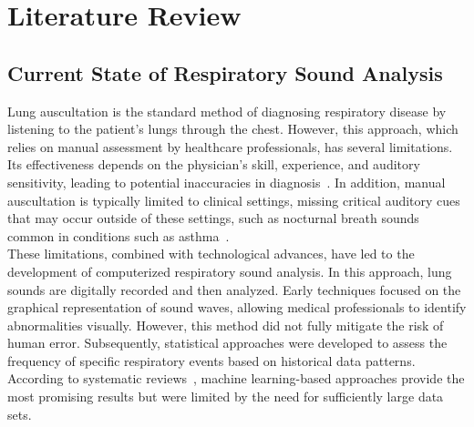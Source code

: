 \cleardoubleoddpage%
\chapter{Literature Review}

\section{Current State of Respiratory Sound Analysis}
Lung auscultation is the standard method of diagnosing respiratory disease by listening to the patient's lungs through the chest. However, this approach, which relies on manual assessment by healthcare professionals, has several limitations. Its effectiveness depends on the physician's skill, experience, and auditory sensitivity, leading to potential inaccuracies in diagnosis~\cite{palaniappan2013computer}. In addition, manual auscultation is typically limited to clinical settings, missing critical auditory cues that may occur outside of these settings, such as nocturnal breath sounds common in conditions such as asthma~\cite{pramono2017automatic}. \\
These limitations, combined with technological advances, have led to the development of computerized respiratory sound analysis. In this approach, lung sounds are digitally recorded and then analyzed. Early techniques focused on the graphical representation of sound waves, allowing medical professionals to identify abnormalities visually. However, this method did not fully mitigate the risk of human error. Subsequently, statistical approaches were developed to assess the frequency of specific respiratory events based on historical data patterns. According to systematic reviews~\cite{palaniappan2013computer}, machine learning-based approaches provide the most promising results but were limited by the need for sufficiently large data sets.

